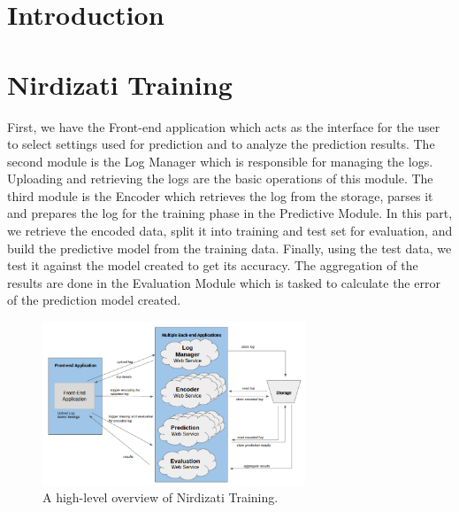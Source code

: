 \documentclass[runningheads,a4paper]{llncs}
\begin{document}
\section{Introduction} \label{sec:intro}


\section{Nirdizati Training} \label{sec:training}
First, we have the Front-end application which acts as the interface for the user to
select settings used for prediction and to analyze the prediction results. The second
module is the Log Manager which is responsible for managing the logs. Uploading
and retrieving the logs are the basic operations of this module. The third module is
the Encoder which retrieves the log from the storage, parses it and prepares the log for
the training phase in the Predictive Module. In this part, we retrieve the encoded data,
split it into training and test set for evaluation, and build the predictive model from the
training data. Finally, using the test data, we test it against the model created to get its
accuracy. The aggregation of the results are done in the Evaluation Module which is
tasked to calculate the error of the prediction model created.


\begin{figure}[t]%
	\centering
	\includegraphics[width=0.7\textwidth]{img/nirdizati-training-architecture}
	\caption{A high-level overview of Nirdizati Training.}
	\label{fig:RNNexample}
\end{figure}
\end{document}
